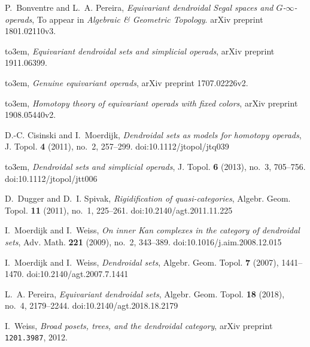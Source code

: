 \documentclass[a4paper,10pt]{article}%
\numberwithin{equation}{section}
\numberwithin{figure}{section}
\theoremstyle{definition} %
\begin{document}
\providecommand{\bysame}{\leavevmode\hbox to3em{\hrulefill}\thinspace}
\providecommand{\MR}{\relax\ifhmode\unskip\space\fi MR }
\providecommand{\MRhref}[2]{%
  \href{http://www.ams.org/mathscinet-getitem?mr=#1}{#2}
}
\providecommand{\doi}[1]{%
  doi:\href{https://dx.doi.org/#1}{#1}}
\providecommand{\arxiv}[1]{%
  arXiv:\href{https://arxiv.org/abs/#1}{#1}}
\providecommand{\href}[2]{#2}
\begin{thebibliography}{MW07}

P.~Bonventre and L.~A. Pereira, \emph{Equivariant dendroidal {S}egal spaces and
  {$G$-$\infty$-}operads}, To appear in \textit{Algebraic \& Geometric
  Topology}. arXiv preprint
  \href{https://arxiv.org/abs/1801.02110v3}{1801.02110v3}.

\bysame, \emph{Equivariant dendroidal sets and simplicial operads}, arXiv
  preprint \href{https://arxiv.org/abs/1911.06399}{1911.06399}.

\bysame, \emph{Genuine equivariant operads}, arXiv preprint
  \href{https://arxiv.org/abs/1707.02226v2}{1707.02226v2}.

\bysame, \emph{Homotopy theory of equivariant operads with fixed colors}, arXiv
  preprint \href{https://arxiv.org/abs/1908.05440v2}{1908.05440v2}.

D.-C. Cisinski and I.~Moerdijk, \emph{Dendroidal sets as models for homotopy
  operads}, J. Topol. \textbf{4} (2011), no.~2, 257--299.
  \doi{10.1112/jtopol/jtq039}

\bysame, \emph{Dendroidal sets and simplicial operads}, J. Topol. \textbf{6}
  (2013), no.~3, 705--756. \doi{10.1112/jtopol/jtt006}

D.~Dugger and D.~I. Spivak, \emph{Rigidification of quasi-categories}, Algebr.
  Geom. Topol. \textbf{11} (2011), no.~1, 225--261.
  \doi{10.2140/agt.2011.11.225}

I.~Moerdijk and I.~Weiss, \emph{On inner {K}an complexes in the category of
  dendroidal sets}, Adv. Math. \textbf{221} (2009), no.~2, 343--389.
  \doi{10.1016/j.aim.2008.12.015}

I.~Moerdijk and I.~Weiss, \emph{Dendroidal sets}, Algebr. Geom. Topol.
  \textbf{7} (2007), 1441--1470. \doi{10.2140/agt.2007.7.1441}

L.~A. Pereira, \emph{Equivariant dendroidal sets}, Algebr. Geom. Topol.
  \textbf{18} (2018), no.~4, 2179--2244. \doi{10.2140/agt.2018.18.2179}

I.~Weiss, \emph{Broad posets, trees, and the dendroidal category}, arXiv
  preprint \href{https://arxiv.org/abs/1201.3987}{\texttt{1201.3987}}, 2012.

\end{thebibliography}
\end{document}
